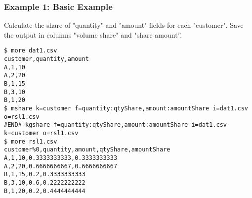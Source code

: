 \subsubsection*{Example 1: Basic Example}

Calculate the share of "quantity" and "amount" fields for each "customer". Save the output in columns "volume share" and "share amount”.


\begin{Verbatim}[baselinestretch=0.7,frame=single]
$ more dat1.csv
customer,quantity,amount
A,1,10
A,2,20
B,1,15
B,3,10
B,1,20
$ mshare k=customer f=quantity:qtyShare,amount:amountShare i=dat1.csv o=rsl1.csv
#END# kgshare f=quantity:qtyShare,amount:amountShare i=dat1.csv k=customer o=rsl1.csv
$ more rsl1.csv
customer%0,quantity,amount,qtyShare,amountShare
A,1,10,0.3333333333,0.3333333333
A,2,20,0.6666666667,0.6666666667
B,1,15,0.2,0.3333333333
B,3,10,0.6,0.2222222222
B,1,20,0.2,0.4444444444
\end{Verbatim}
